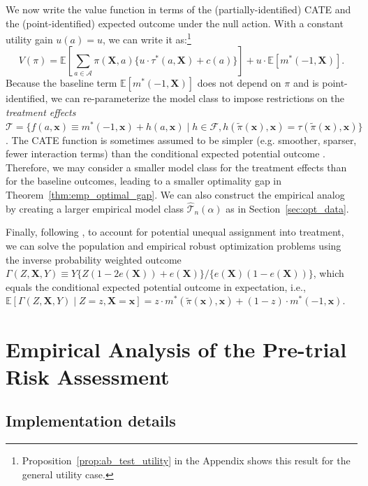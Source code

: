 \documentclass[12pt]{article}
\theoremstyle{definition}
\newcommand{\E}{\ensuremath{\mathbb{E}}}
\newcommand{\bX}{\bm X}
\newcommand{\bx}{\bm x}
\newcommand{\<}{\langle}
\renewcommand{\>}{\rangle}
\newcommand\mcal[1]{\ensuremath{\mathcal{#1}}}
\begin{document}
We now write the value function in terms of the (partially-identified)
CATE and the (point-identified) expected outcome under the null
action. With a constant utility gain $u(a) = u$, we can write it
as:\footnote{Proposition~\ref{prop:ab_test_utility} in the Appendix
  shows this result for the general utility case.}
\[
  V(\pi) = \E\left[\sum_{a \in
    \mathcal{A}} \pi(\bX, a) \{u \cdot \tau^\ast(a, \bX) + c(a)\}\right] + u \cdot \E[m^\ast(-1,\bX)].
\]
Because the baseline term $\E[m^\ast(-1,\bX)]$ does not depend on $\pi$
and is point-identified, we can re-parameterize the model class to
impose restrictions on the \emph{treatment effects}
$\mcal{T} = \{f(a,\bx) \equiv m^\ast(-1, \bx) + h(a, \bx) \mid h \in
\mathcal{F}, h(\tilde{\pi}(\bx), \bx) = \tau(\tilde{\pi}(\bx), \bx)\}$.
The CATE function is sometimes assumed to be simpler (e.g. smoother, sparser,
fewer interaction terms) than the conditional expected potential outcome
\citep[see, e.g.,][who argue that the CATE should be easier to estimate]{Kunzel2019}.
Therefore, we may consider a smaller model
class for the treatment effects than for the baseline outcomes,
leading to a smaller optimality gap in
Theorem~\ref{thm:emp_optimal_gap}.  We can also construct the
empirical analog by creating a larger empirical model class
$\widehat{\mcal{T}}_n(\alpha)$ as in Section~\ref{sec:opt_data}.

Finally, following \citet{Kitagawa2018}, to account for potential
unequal assignment into treatment, we can solve the population and
empirical robust optimization problems using the inverse probability
weighted outcome
$\Gamma(Z, \bX, Y) \equiv Y\{Z(1-2e(\bX)) + e(\bX)\}/\{e(\bX)(1 -
e(\bX))\}$, which equals the conditional expected potential outcome in
expectation, i.e.,
$\E[\Gamma(Z, \bX, Y) \mid Z = z, \bX = \bx] = z \cdot
m^\ast(\tilde{\pi}(\bx), \bx) + (1-z) \cdot m^\ast(-1, \bx)$.







\section{Empirical Analysis of the Pre-trial Risk Assessment}
\label{sec:application}


\subsection{Implementation details}
\label{sec:implement}
\end{document}
